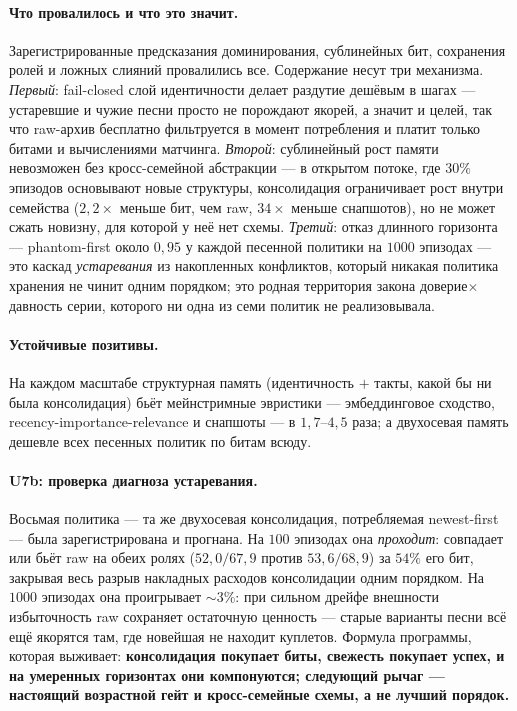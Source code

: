 \documentclass{article}
\begin{document}
\paragraph{Что провалилось и что это значит.} Зарегистрированные
предсказания доминирования, сублинейных бит, сохранения ролей и
ложных слияний провалились все. Содержание несут три механизма.
\emph{Первый}: fail-closed слой идентичности делает раздутие дешёвым
в шагах --- устаревшие и чужие песни просто не порождают якорей, а
значит и целей, так что raw-архив бесплатно фильтруется в момент
потребления и платит только битами и вычислениями матчинга.
\emph{Второй}: сублинейный рост памяти невозможен без кросс-семейной
абстракции --- в открытом потоке, где $30\%$ эпизодов основывают
новые структуры, консолидация ограничивает рост внутри семейства
($2{,}2\times$ меньше бит, чем raw, $34\times$ меньше снапшотов), но
не может сжать новизну, для которой у неё нет схемы. \emph{Третий}:
отказ длинного горизонта --- phantom-first около $0{,}95$ у каждой
песенной политики на $1000$ эпизодах --- это каскад
\emph{устаревания} из накопленных конфликтов, который никакая
политика хранения не чинит одним порядком; это родная территория
закона доверие$\times$давность серии, которого ни одна из семи
политик не реализовывала.

\paragraph{Устойчивые позитивы.} На каждом масштабе структурная
память (идентичность $+$ такты, какой бы ни была консолидация) бьёт
мейнстримные эвристики --- эмбеддинговое сходство,
recency-importance-relevance \citep{genagents2023,memgas2025} и
снапшоты --- в $1{,}7$--$4{,}5$ раза; а двухосевая память дешевле
всех песенных политик по битам всюду.

\paragraph{U7b: проверка диагноза устаревания.} Восьмая политика ---
та же двухосевая консолидация, потребляемая newest-first --- была
зарегистрирована и прогнана. На $100$ эпизодах она \emph{проходит}:
совпадает или бьёт raw на обеих ролях ($52{,}0/67{,}9$ против
$53{,}6/68{,}9$) за $54\%$ его бит, закрывая весь разрыв накладных
расходов консолидации одним порядком. На $1000$ эпизодах она
проигрывает $\sim 3\%$: при сильном дрейфе внешности избыточность raw
сохраняет остаточную ценность --- старые варианты песни всё ещё
якорятся там, где новейшая не находит куплетов. Формула программы,
которая выживает: \textbf{консолидация покупает биты, свежесть
покупает успех, и на умеренных горизонтах они компонуются; следующий
рычаг --- настоящий возрастной гейт и кросс-семейные схемы, а не
лучший порядок.}
\end{document}
